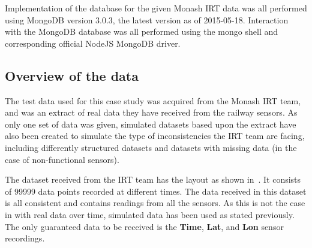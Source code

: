 \documentclass[a4paper,11pt]{article}
\begin{document}
Implementation of the database for the given Monash IRT data was all performed using MongoDB version 3.0.3, the latest
version as of 2015-05-18. Interaction with the MongoDB database was all performed using the mongo shell and corresponding
official NodeJS MongoDB driver.

\subsection{Overview of the data} %
\label{sub:overview_of_the_data}

The test data used for this case study was acquired from the Monash IRT team, and was an extract of real data they have
received from the railway sensors. As only one set of data was given, simulated datasets based upon the extract have
also been created to simulate the type of inconsistencies the IRT team are facing, including differently structured
datasets and datasets with missing data (in the case of non-functional sensors).

The dataset received from the IRT team has the layout as shown in~. It consists of 99999 data points
recorded at different times. The data received in this dataset is all consistent and contains readings from all the sensors.
As this is not the case in with real data over time, simulated data has been used as stated previously. The only
guaranteed data to be received is the \textbf{Time}, \textbf{Lat}, and \textbf{Lon} sensor recordings.
\end{document}
